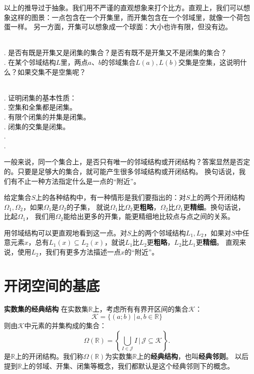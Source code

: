 \documentclass[12pt,UTF8,fontset=none]{ctexbook}
\begin{document}
\begin{appendix}
以上的推导过于抽象。我们用不严谨的直观想象来打个比方。直观上，我们可以想象这样的图景：一点包含在一个开集里，而开集包含在一个邻域里，就像一个荷包蛋一样。
另一方面，开集可以想象成一个球面：大小也许有限，但没有边。

\begin{sk}
    \mbox{} \\
    . 是否有既是开集又是闭集的集合？是否有既不是开集又不是闭集的集合？\\
    . 在某个邻域结构$L$里，两点$a$、$b$的邻域集合$L(a), L(b)$交集是空集，这说明什么？如果交集不是空集呢？
\end{sk}

\begin{xt}
    \mbox{} \\
    . 证明闭集的基本性质：\\
    . 空集和全集都是闭集。\\
    . 有限个闭集的并集是闭集。\\
    . 闭集的交集是闭集。\\
    . \\
    .
\end{xt}

一般来说，同一个集合上，是否只有唯一的邻域结构或开闭结构？答案显然是否定的。只要是足够大的集合，就可能产生很多邻域结构或开闭结构。
换句话说，我们有不止一种方法指定什么是一点的“附近”。

给定集合$S$上的各种结构中，有一种情形是我们要指出的：对$S$上的两个开闭结构$\Omega_1, \Omega_2$，如果$\Omega_1$是$\Omega_2$的子集，
就说$\Omega_1$比$\Omega_2$更\textbf{粗略}，$\Omega_2$比$\Omega_1$更\textbf{精细}。换句话说，比起$\Omega_1$，
我们用$\Omega_2$能给出更多的开集，能更精细地比较点与点之间的关系。

用邻域结构可以更直观地看到这一点。对$S$上的两个邻域结构$L_1, L_2$，如果对$S$中任意元素$x$，总有$L_1(x) \subseteq L_2(x)$，就说$L_1$比$L_2$更\textbf{粗略}，$L_2$比$L_1$更\textbf{精细}。
直观来说，使用$L_2$，我们有更多方法描述一点$x$的“附近”。

\section{开闭空间的基底}

\begin{tm}{\textbf{实数集的经典结构}}\label{tm:4-1-0}
    在实数集$\mathbb{R}$上，考虑所有有界开区间的集合$\mathcal{K}$：
    $$ \mathcal{K} = \{ (a;b) \, | \, a, b \in \mathbb{R} \}$$
    则由$\mathcal{K}$中元素的并集构成的集合：
    $$ \Omega(\mathbb{R}) = \left\{\bigcup_{I \in \mathcal{J}} I \, \Bigg| \,\mathcal{J} \subseteq  \mathcal{K} \right\}.$$
    是$\mathbb{R}$上的开闭结构。我们称$\Omega(\mathbb{R})$为实数集$\mathbb{R}$上的\textbf{经典结构}，也叫\textbf{经典邻则}。
    以后提到$\mathbb{R}$上的邻域、开集、闭集等概念，我们都默认是这个经典邻则下的概念。
\end{tm}


\end{appendix}
\end{document}
